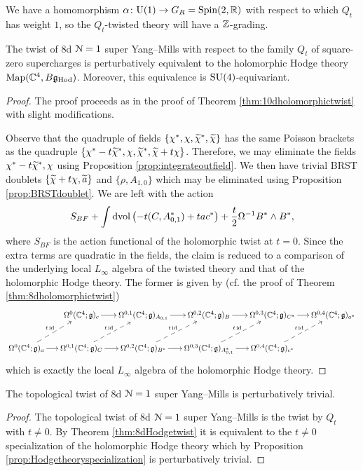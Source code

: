 \documentclass[10pt, oneside]{article}
\renewcommand{\U}{\mathrm{U}}
\begin{document}
We have a homomorphism $\alpha\colon \U(1)\rightarrow G_R=\Spin(2, \RR)$ with respect to which $Q_t$ has weight $1$, so the $Q_t$-twisted theory will have a $\mathbb Z$-grading.

\begin{theorem}
The twist of 8d $\mathcal N=1$ super Yang--Mills with respect to the family $Q_t$ of square-zero supercharges is perturbatively equivalent to the holomorphic Hodge theory $\operatorname{Map}(\mathbb C^4, B\mathfrak g_{\mathrm{Hod}})$. Moreover, this equivalence is $\mathrm{SU}(4)$-equivariant.
\label{thm:8dHodgetwist}
\end{theorem}
\begin{proof}
The proof proceeds as in the proof of Theorem \ref{thm:10dholomorphictwist} with slight modifications.

Observe that the quadruple of fields $\{\chi^*, \chi, \widetilde{\chi}^*, \widetilde{\chi}\}$ has the same Poisson brackets as the quadruple $\{\chi^*-t\widetilde{\chi}^*, \chi, \widetilde{\chi}^*, \widetilde{\chi} + t\chi\}$. Therefore, we may eliminate the fields $\chi^*-t\widetilde{\chi}^*, \chi$ using Proposition \ref{prop:integrateoutfield}. We then have trivial BRST doublets $\{\widetilde{\chi} + t\chi, \widetilde{a}\}$ and $\{\rho, A_{1, 0}\}$ which may be eliminated using Proposition \ref{prop:BRSTdoublet}. We are left with the action
\[S_{BF} + \int\operatorname{dvol}\left(-t(C, A_{0, 1}^*) + ta c^*\right) + \frac{t}{2} \Omega^{-1} B^*\wedge B^*,\]
where $S_{BF}$ is the action functional of the holomorphic twist at $t=0$. Since the extra terms are quadratic in the fields, the claim is reduced to a comparison of the underlying local $L_\infty$ algebra of the twisted theory and that of the holomorphic Hodge theory. The former is given by (cf. the proof of Theorem \ref{thm:8dholomorphictwist})
\[
\xymatrix@C=0.5cm{
&\Omega^0(\CC^4; \gg)_c \ar[r] &\Omega^{0,1}(\CC^4; \gg)_{A_{0,1}} \ar[r] &\Omega^{0,2}(\CC^4; \gg)_{B} \ar[r] &\Omega^{0,3}(\CC^4; \gg)_{C^*} \ar[r] &\Omega^{0,4}(\CC^4; \gg)_{a^*} \\
\Omega^0(\CC^4; \gg)_a \ar[r] \ar@{-->}^{t\id}[ur] & \Omega^{0,1}(\CC^4; \gg)_C \ar[r] \ar@{-->}^{t\id}[ur] &\Omega^{0,2}(\CC^4; \gg)_{B^*} \ar[r] \ar@{-->}^{t\id}[ur] &\Omega^{0,3}(\CC^4; \gg)_{A_{0,1}^*} \ar[r] \ar@{-->}^{t\id}[ur] &\Omega^{0,4}(\CC^4; \gg)_{c^*} \ar@{-->}^{t\id}[ur] &
}
\]
which is exactly the local $L_\infty$ algebra of the holomorphic Hodge theory.
\end{proof}

\begin{corollary}
The topological twist of 8d $\mathcal N=1$ super Yang--Mills is perturbatively trivial.
\label{cor:8dtopologicaltwist}
\end{corollary}
\begin{proof}
The topological twist of 8d $\mathcal N=1$ super Yang--Mills is the twist by $Q_t$ with $t\neq 0$. By Theorem \ref{thm:8dHodgetwist} it is equivalent to the $t\neq 0$ specialization of the holomorphic Hodge theory which by Proposition \ref{prop:Hodgetheoryspecialization} is perturbatively trivial.
\end{proof}
\end{document}
